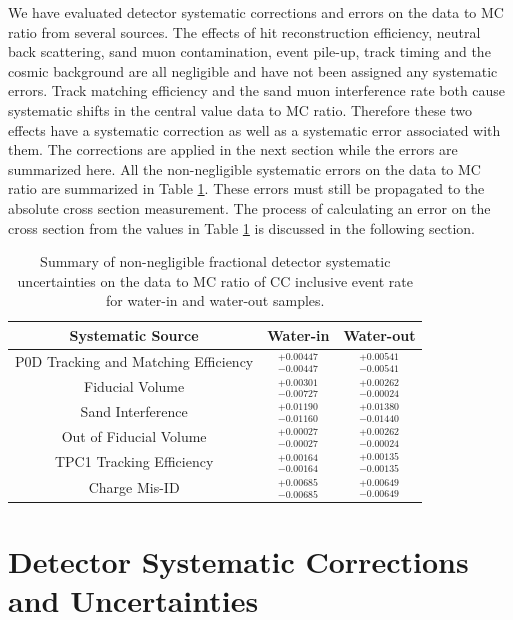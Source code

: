 We have evaluated detector systematic corrections and errors on the data to MC ratio from several sources. The effects of hit reconstruction efficiency, neutral back scattering, sand muon contamination, event pile-up, track timing and the cosmic background are all negligible and have not been assigned any systematic errors. Track matching efficiency and the sand muon interference rate both cause systematic shifts in the central value data to MC ratio. Therefore these two effects have a systematic correction as well as a systematic error associated with them. The corrections are applied in the next section while the errors are summarized here. All the non-negligible systematic errors on the data to MC ratio are summarized in Table \ref{tab:syssum}. These errors must still be propagated to the absolute cross section measurement. The process of calculating an error on the cross section from the values in Table \ref{tab:syssum} is discussed in the following section.

\begin{table}[h]
\caption{Summary of non-negligible fractional detector systematic uncertainties on the data to MC ratio of CC inclusive event rate for water-in and water-out samples.}
\label{tab:syssum}
\centering
\begin{tabular}{ccc}
\toprule
Systematic Source & Water-in & Water-out\\
\midrule
P0D Tracking and Matching Efficiency & $^{+0.00447}_{-0.00447}$ & $^{+0.00541}_{-0.00541}$\\[2pt]\midrule
Fiducial Volume & $^{+0.00301}_{-0.00727}$ & $^{+0.00262}_{-0.00024}$\\[2pt]\midrule
Sand Interference & $^{+0.01190}_{-0.01160}$ & $^{+0.01380}_{-0.01440}$\\[2pt]\midrule
Out of Fiducial Volume & $^{+0.00027}_{-0.00027}$ & $^{+0.00262}_{-0.00024}$\\[2pt]\midrule
TPC1 Tracking Efficiency & $^{+0.00164}_{-0.00164}$ & $^{+0.00135}_{-0.00135}$\\[2pt]\midrule
Charge Mis-ID & $^{+0.00685}_{-0.00685}$ & $^{+0.00649}_{-0.00649}$\\[2pt]
\bottomrule
\end{tabular}
\end{table}

\clearpage

\section{Detector Systematic Corrections and Uncertainties}
\label{sec:detsysprop}

